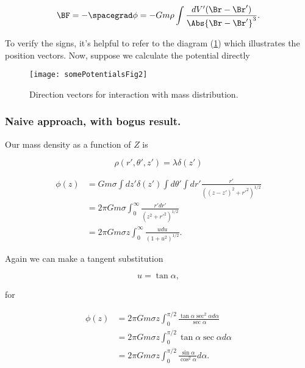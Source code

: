 \begin{equation}\label{eqn:classicalMechanicsPs2:130}
\BF = - \spacegrad \phi = - G m \rho \int \frac{dV' (\Br - \Br')}{\Abs{\Br - \Br'}^3}.
\end{equation}

To verify the signs, it's helpful to refer to the diagram (\ref{fig:classicalMechanicsPs2:somePotentialsFig2}) which illustrates the position vectors.  Now, suppose we calculate the potential directly
\begin{figure}[htp]
   \centering
   \texttt{[image: somePotentialsFig2]}
   \caption{Direction vectors for interaction with mass distribution.}\label{fig:classicalMechanicsPs2:somePotentialsFig2}
\end{figure}

\subsubsection{Naive approach, with bogus result.}
Our mass density as a function of $Z$ is

\begin{equation}\label{eqn:classicalMechanicsPs2:170}
\rho(r', \theta', z') = \lambda \delta(z')
\end{equation}

\begin{align*}
\phi(z)
&= G m \sigma \int dz' \delta(z') \int d\theta' \int dr' \frac{r' }{((z-z')^2 + {r'}^2)^{1/2}} \\
&= 2 \pi G m \sigma \int_0^\infty \frac{r' dr' }{(z^2 + {r'}^2)^{1/2}} \\
&= 2 \pi G m \sigma z \int_0^\infty \frac{u du }{(1 + u^2)^{1/2}}.
\end{align*}

Again we can make a tangent substitution

\begin{equation}\label{eqn:classicalMechanicsPs2:150}
u = \tan\alpha,
\end{equation}

for

\begin{align*}
\phi(z)
&= 2 \pi G m \sigma z \int_0^{\pi/2} \frac{\tan \alpha \sec^2 \alpha d \alpha }{\sec\alpha} \\
&= 2 \pi G m \sigma z \int_0^{\pi/2} \tan \alpha \sec \alpha d \alpha \\
&= 2 \pi G m \sigma z \int_0^{\pi/2} \frac{\sin \alpha}{\cos^2 \alpha} d \alpha.
\end{align*}

